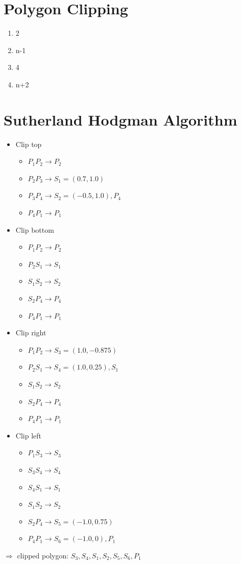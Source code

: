 \documentclass{article}
\begin{document}
\section{Polygon Clipping}
\begin{enumerate}[label=(\alph*)]
\item 2
\item n-1
\item 4
\item n+2
\end{enumerate}

\section{Sutherland Hodgman Algorithm}
\begin{itemize}
\item Clip top
\begin{itemize}
\item $P_1P_2 \rightarrow P_2$
\item $P_2P_3 \rightarrow S_1 = (0.7,1.0)$
\item $P_3P_4 \rightarrow S_2 = (-0.5,1.0), P_4$
\item $P_4P_1 \rightarrow P_1$
\end{itemize}
\item Clip bottom
\begin{itemize}
\item $P_1P_2 \rightarrow P_2$
\item $P_2S_1 \rightarrow S_1$
\item $S_1S_2 \rightarrow S_2$
\item $S_2P_4 \rightarrow P_4$
\item $P_4P_1 \rightarrow P_1$
\end{itemize}
\item Clip right
\begin{itemize}
\item $P_1P_2 \rightarrow S_3 = (1.0,-0.875)$
\item $P_2S_1 \rightarrow S_4 = (1.0,0.25), S_1$
\item $S_1S_2 \rightarrow S_2$
\item $S_2P_4 \rightarrow P_4$
\item $P_4P_1 \rightarrow P_1$
\end{itemize}
\item Clip left
\begin{itemize}
\item $P_1S_3 \rightarrow S_3$
\item $S_3S_4 \rightarrow S_4$
\item $S_4S_1 \rightarrow S_1$
\item $S_1S_2 \rightarrow S_2$
\item $S_2P_4 \rightarrow S_5 = (-1.0,0.75)$
\item $P_4P_1 \rightarrow S_6 = (-1.0,0), P_1$
\end{itemize}
\end{itemize}
$\Rightarrow$ clipped polygon: $S_3, S_4,S_1,S_2, S_5, S_6, P_1$
\end{document}
